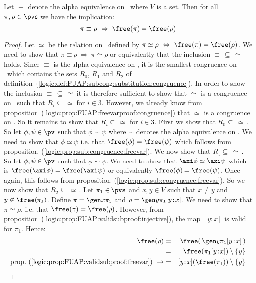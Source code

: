 \begin{prop}\label{logic:prop:FUAP:charsubcong:freevar}
Let $\equiv$ denote the alpha equivalence on \pvs\ where $V$
is a set. Then for all $\pi,\rho\in\pvs$ we have the implication:
    \[
    \pi\equiv\rho\ \Rightarrow\ \free(\pi)=\free(\rho)
    \]
\end{prop}
\begin{proof}
Let $\simeq$ be the relation on \pvs\ defined by $\pi\simeq\rho\
\Leftrightarrow\ \free(\pi)=\free(\rho)$. We need to show that
$\pi\equiv\rho\ \Rightarrow\ \pi\simeq\rho$ or equivalently that the
inclusion $\equiv\,\subseteq\,\simeq$ holds. Since $\equiv$ is the
alpha equivalence on \pvs, it is the smallest congruence on
\pvs\ which contains the sets $R_{0}$, $R_{1}$ and $R_{2}$ of
definition~(\ref{logic:def:FUAP:subcong:substitution:congruence}).
In order to show the inclusion $\equiv\,\subseteq\,\simeq$ it is
therefore sufficient to show that $\simeq$ is a congruence on \pvs\
such that $R_{i}\subseteq\,\simeq$ for $i\in 3$. However, we already
know from
proposition~(\ref{logic:prop:FUAP:freevarproof:congruence}) that
$\simeq$ is a congruence on \pvs. So it remains to show that
$R_{i}\subseteq\,\simeq$ for $i\in 3$. First we show that
$R_{0}\subseteq\,\simeq$\,. So let $\phi,\psi\in\pv$ such that
$\phi\sim\psi$ where $\sim$ denotes the alpha equivalence on
\pv. We need to show that $\phi\simeq\psi$ i.e. that
$\free(\phi)=\free(\psi)$ which follows from
proposition~(\ref{logic:prop:sub:congruence:freevar}). We now show
that $R_{1}\subseteq\,\simeq$\,. So let $\phi,\psi\in\pv$ such that
$\phi\sim\psi$. We need to show that $\axi\phi\simeq\axi\psi$ which
is $\free(\axi\phi)=\free(\axi\psi)$ or equivalently
$\free(\phi)=\free(\psi)$. Once again, this follows from
proposition~(\ref{logic:prop:sub:congruence:freevar}). So we now
show that $R_{2}\subseteq\,\simeq$\,. Let $\pi_{1}\in\pvs$ and
$x,y\in V$ such that $x\neq y$ and $y\not\in\free(\pi_{1})$. Define
$\pi=\gen x\pi_{1}$ and $\rho=\gen y\pi_{1}[y\!:\!x]$. We need to
show that $\pi\simeq\rho$, i.e. that $\free(\pi)=\free(\rho)$.
However, from
proposition~(\ref{logic:prop:FUAP:validsubproof:injective}), the map
$[y\!:\!x]$ is valid for $\pi_{1}$. Hence:
    \begin{eqnarray*}
    \free(\rho)&=&\free(\,\gen y\pi_{1}[y\!:\!x]\,)\\
    &=&\free(\pi_{1}[y\!:\!x])\setminus\{y\}\\
    \mbox{prop.~(\ref{logic:prop:FUAP:validsubproof:freevar})}\ \rightarrow
    &=&[y\!:\!x](\free(\pi_{1}))\setminus\{y\}\\

\end{eqnarray*}
\end{proof}
